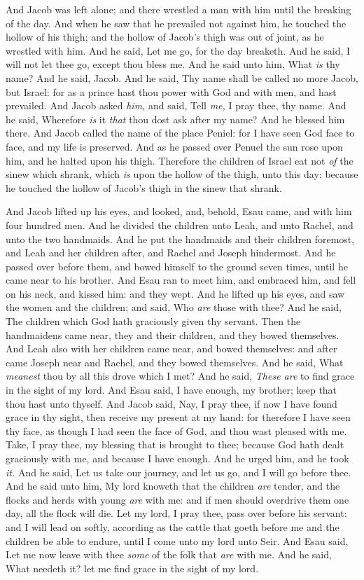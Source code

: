 \documentclass[11pt,letterpaper,oneside]{memoir}
\begin{document}
And Jacob was left alone; and there wrestled a man with him until the
breaking of the day. And when he saw that he prevailed not against him,
he touched the hollow of his thigh; and the hollow of Jacob's thigh was
out of joint, as he wrestled with him. And he said, Let me go, for the
day breaketh. And he said, I will not let thee go, except thou bless me.
And he said unto him, What \emph{is} thy name? And he said, Jacob. And
he said, Thy name shall be called no more Jacob, but Israel: for as a
prince hast thou power with God and with men, and hast prevailed. And
Jacob asked \emph{him,} and said, Tell \emph{me,} I pray thee, thy name.
And he said, Wherefore \emph{is} it \emph{that} thou dost ask after my
name? And he blessed him there. And Jacob called the name of the place
Peniel: for I have seen God face to face, and my life is preserved. And
as he passed over Penuel the sun rose upon him, and he halted upon his
thigh. Therefore the children of Israel eat not \emph{of} the sinew
which shrank, which \emph{is} upon the hollow of the thigh, unto this
day: because he touched the hollow of Jacob's thigh in the sinew that
shrank.

And Jacob lifted up his eyes, and looked, and, behold, Esau came, and
with him four hundred men. And he divided the children unto Leah, and
unto Rachel, and unto the two handmaids. And he put the handmaids and
their children foremost, and Leah and her children after, and Rachel and
Joseph hindermost. And he passed over before them, and bowed himself to
the ground seven times, until he came near to his brother. And Esau ran
to meet him, and embraced him, and fell on his neck, and kissed him: and
they wept. And he lifted up his eyes, and saw the women and the
children; and said, Who \emph{are} those with thee? And he said, The
children which God hath graciously given thy servant. Then the
handmaidens came near, they and their children, and they bowed
themselves. And Leah also with her children came near, and bowed
themselves: and after came Joseph near and Rachel, and they bowed
themselves. And he said, What \emph{meanest} thou by all this drove
which I met? And he said, \emph{These are} to find grace in the sight of my
lord. And Esau said, I have enough, my brother; keep that thou hast unto
thyself. And Jacob said, Nay, I pray thee, if now I have found grace in
thy sight, then receive my present at my hand: for therefore I have seen
thy face, as though I had seen the face of God, and thou wast pleased
with me. Take, I pray thee, my blessing that is brought to thee; because
God hath dealt graciously with me, and because I have enough. And he
urged him, and he took \emph{it. }And he said, Let us take our journey,
and let us go, and I will go before thee. And he said unto him, My lord
knoweth that the children \emph{are} tender, and the flocks and herds
with young \emph{are} with me: and if men should overdrive them one day,
all the flock will die. Let my lord, I pray thee, pass over before his
servant: and I will lead on softly, according as the cattle that goeth
before me and the children be able to endure, until I come unto my lord
unto Seir. And Esau said, Let me now leave with thee \emph{some} of the
folk that \emph{are} with me. And he said, What needeth it? let me find
grace in the sight of my lord.
\end{document}
